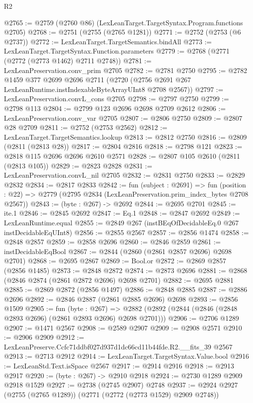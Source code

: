 \begin{lexlean}{R2}
\begin{coremodule}
@2765 := @2759 (@2760 @86) (LexLeanTarget.TargetSyntax.Program.functions @2705)
@2768 := @2751 (@2755 (@2765 @1281))
@2771 := @2752 (@2753 (@6 @2737))
@2772 := LexLeanTarget.TargetSemantics.bindAll
@2773 := LexLeanTarget.TargetSyntax.Function.parameters
@2779 := @2768 (@2771 (@2772 (@2773 @1462) @2711 @2748))
@2781 := LexLeanPreservation.conv_prim @2705
@2782 := @2781 @2750
@2795 := @2782
    @1459
    @377
    @2699
    @2696
    @2711
    (@2720 (@2756 @2691 @267 LexLeanRuntime.instIndexableByteArrayUInt8 @2708 @2567))
@2797 := LexLeanPreservation.convL_cons @2705
@2798 := @2797 @2750
@2799 := @2798 @113
@2804 := @2799 @123 @2696 @2698 @2709 @2612
@2806 := LexLeanPreservation.conv_var @2705
@2807 := @2806 @2750
@2809 := @2807 @28 @2709
@2811 := @2752 (@2753 @2562)
@2812 := LexLeanTarget.TargetSemantics.lookup
@2813 := @2812 @2750
@2816 := @2809 (@2811 (@2813 @28))
@2817 := @2804 @2816
@2818 := @2798 @121
@2823 := @2818 @115 @2696 @2696 @2610 @2571
@2828 := @2807 @105 @2610 (@2811 (@2813 @105))
@2829 := @2823 @2828
@2831 := LexLeanPreservation.convL_nil @2705
@2832 := @2831 @2750
@2833 := @2829 @2832
@2834 := @2817 @2833
@2842 := fun (subject : @2691) =>
  fun (position : @22) => @2779 (@2795 @2834 (LexLeanPreservation.prim_index_bytes @2708 @2567))
@2843 := (byte : @267) -> @2692
@2844 := @2695 @2701
@2845 := ite.{1}
@2846 := @2845 @2692
@2847 := Eq.{1}
@2848 := @2847 @2692
@2849 := LexLeanRuntime.equal
@2855 := @2849 @267 (instBEqOfDecidableEq.{0} @267 instDecidableEqUInt8)
@2856 := @2855 @2567
@2857 := @2856 @1474
@2858 := @2848 @2857
@2859 := @2858 @2696
@2860 := @2846 @2859
@2861 := instDecidableEqBool
@2867 := @2844 (@2860 (@2861 @2857 @2696) @2698 @2701)
@2868 := @2695 @2867
@2869 := Bool.or
@2872 := @2869 @2857 (@2856 @1485)
@2873 := @2848 @2872
@2874 := @2873 @2696
@2881 := @2868 (@2846 @2874 (@2861 @2872 @2696) @2698 @2701)
@2882 := @2695 @2881
@2885 := @2869 @2872 (@2856 @1497)
@2886 := @2848 @2885
@2887 := @2886 @2696
@2892 := @2846 @2887 (@2861 @2885 @2696) @2698
@2893 := @2856 @1509
@2905 := fun (byte : @267) =>
  @2882 (@2892 (@2844 (@2846 (@2848 @2893 @2696) (@2861 @2893 @2696) @2698 @2701)))
@2906 := @2706 @1289
@2907 := @1471 @2567
@2908 := @2589 @2907
@2909 := @2908 @2571
@2910 := @2906 @2909
@2912 := LexLeanPreserve.Ccfc71ddbf027d937d1dc66cd11b44fde.R2.__fits_39 @2567
@2913 := @2713 @2912
@2914 := LexLeanTarget.TargetSyntax.Value.bool
@2916 := LexLeanStd.Text.isSpace @2567
@2917 := @2914 @2916
@2918 := @2913 @2917
@2920 := (byte : @267) -> @2910 @2918
@2924 := @2730 @1289 @2909 @2918 @1529
@2927 := @2738 (@2745 @2907) @2748
@2937 := @2924 @2927 (@2755 (@2765 @1289)) (@2771 (@2772 (@2773 @1529) @2909 @2748))

\end{coremodule}
\end{lexlean}
